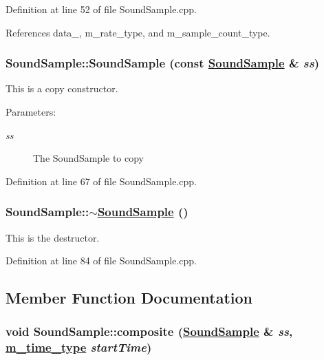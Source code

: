 Definition at line 52 of file Sound\-Sample.cpp.

References data\_\-, m\_\-rate\_\-type, and m\_\-sample\_\-count\_\-type.\hypertarget{classSoundSample_a1}{
\subsubsection[SoundSample]{\setlength{\rightskip}{0pt plus 5cm}Sound\-Sample::Sound\-Sample (const \hyperlink{classSoundSample}{Sound\-Sample} \& {\em ss})}}
\label{classSoundSample_a1}


This is a copy constructor. \begin{Desc}
\item[Parameters:]
\begin{description}
\item[{\em ss}]The Sound\-Sample to copy \end{description}
\end{Desc}


Definition at line 67 of file Sound\-Sample.cpp.\hypertarget{classSoundSample_a3}{
\subsubsection[$\sim$SoundSample]{\setlength{\rightskip}{0pt plus 5cm}Sound\-Sample::$\sim$\hyperlink{classSoundSample}{Sound\-Sample} ()}}
\label{classSoundSample_a3}


This is the destructor. 

Definition at line 84 of file Sound\-Sample.cpp.

\subsection{Member Function Documentation}
\hypertarget{classSoundSample_a8}{
\subsubsection[composite]{\setlength{\rightskip}{0pt plus 5cm}void Sound\-Sample::composite (\hyperlink{classSoundSample}{Sound\-Sample} \& {\em ss}, \hyperlink{Types_8h_a2}{m\_\-time\_\-type} {\em start\-Time})}}
\label{classSoundSample_a8}


